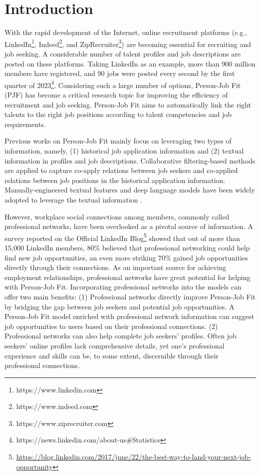 \section{Introduction}

With the rapid development of the Internet, online recruitment platforms (e.g., LinkedIn\footnote{https://www.linkedin.com}{}, Indeed\footnote{https://www.indeed.com}{}, and ZipRecruiter\footnote{https://www.ziprecruiter.com}{}) are becoming essential for recruiting and job seeking. A considerable number of talent profiles and job descriptions are posted on these platforms. Taking LinkedIn as an example, more than 900 million members have registered, and 90 jobs were posted every second by the first quarter of 2023\footnote{https://news.linkedin.com/about-us\#Statistics}{}. Considering such a large number of options, Person-Job Fit (PJF) \cite{malinowski2006matching} has become a critical research topic for improving the efficiency of recruitment and job seeking. Person-Job Fit aims to automatically link the right talents to the right job positions according to talent competencies and job requirements. 

Previous works on Person-Job Fit mainly focus on leveraging two types of information, namely, (1) historical job application information and (2) textual information in profiles and job descriptions. Collaborative filtering-based methods \cite{shalaby2017help,bian2020learning} are applied to capture co-apply relations between job seekers and co-applied relations between job positions in the historical application information. Manually-engineered textual features and deep language models have been widely adopted to leverage the textual information \cite{bian2019domain,qin2018enhancing, yan2019interview, lu2013recommender}.

However, workplace social connections among members, commonly called professional networks, have been overlooked as a pivotal source of information. A survey reported on the Official LinkedIn Blog\footnote{\url{https://blog.linkedin.com/2017/june/22/the-best-way-to-land-your-next-job-opportunity}} showed that out of more than 15,000 LinkedIn members, 80\% believed that professional networking could help find new job opportunities, an even more striking 70\% gained job opportunities directly through their connections. As an important source for achieving employment relationships, professional networks have great potential for helping with Person-Job Fit. Incorporating professional networks into the models can offer two main benefits: (1) Professional networks directly improve Person-Job Fit by bridging the gap between job seekers and potential job opportunities. A Person-Job Fit model enriched with professional network information can suggest job opportunities to users based on their professional connections. (2) Professional networks can also help complete job seekers' profiles. Often job seekers' online profiles lack comprehensive details, yet one's professional experience and skills can be, to some extent, discernible through their professional connections.

